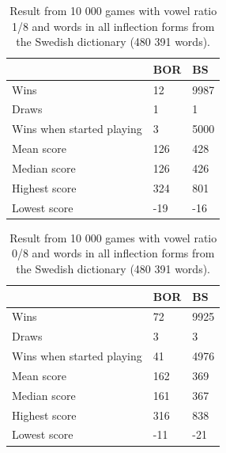 \documentclass[a4paper, 12pt]{report}
\begin{document}
\begin{table}[h]
\centering
    \begin{tabular}{ l | l | l }
   	& BOR & BS \\
   	\hline
   	Wins & 12 & 9987 \\
	Draws & 1 & 1 \\
	Wins when started playing & 3 & 5000 \\   	
	Mean score & 126 & 428 \\
	Median score & 126 & 426 \\	 	 
	Highest score & 324 & 801 \\
	Lowest score & -19 & -16 \\		
    \end{tabular}
\caption{Result from 10 000 games with vowel ratio 1/8 and words in all inflection forms from the Swedish dictionary (480 391 words).}
\label{tab:borbsstats1}
\end{table}

\begin{table}[h]
\centering
    \begin{tabular}{ l | l | l }
   	& BOR & BS \\
   	\hline
   	Wins & 72 & 9925 \\
	Draws & 3 & 3 \\
	Wins when started playing & 41 & 4976 \\   	
	Mean score & 162 & 369 \\
	Median score & 161 & 367 \\	 	 
	Highest score & 316 & 838 \\
	Lowest score & -11 & -21 \\		
    \end{tabular}
\caption{Result from 10 000 games with vowel ratio 0/8 and words in all inflection forms from the Swedish dictionary (480 391 words).}
\label{tab:borbsstats0}
\end{table}
\end{document}
